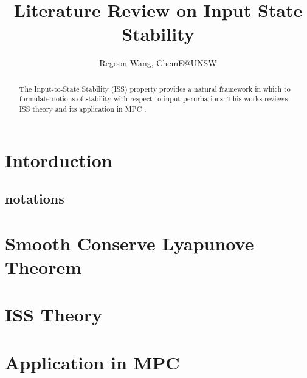 \documentclass{paper}
\begin{document}
 
\title{Literature Review on Input State Stability}
\author{Regoon Wang, ChemE@UNSW} 

\maketitle
\begin{abstract}
The Input-to-State Stability (ISS) property provides a natural framework in which to formulate notions
of stability with respect to input perurbations. This works reviews ISS theory \cite{iss:1,iss:2,iss:3,iss:4} 
and its application in MPC \cite{iss:5,iss:6}. 
\end{abstract} 

\tableofcontents
\section{Intorduction}
\subsection{notations}
\section{Smooth Conserve Lyapunove Theorem}
\section{ISS Theory}
\section{Application in MPC}


 
\end{document}
